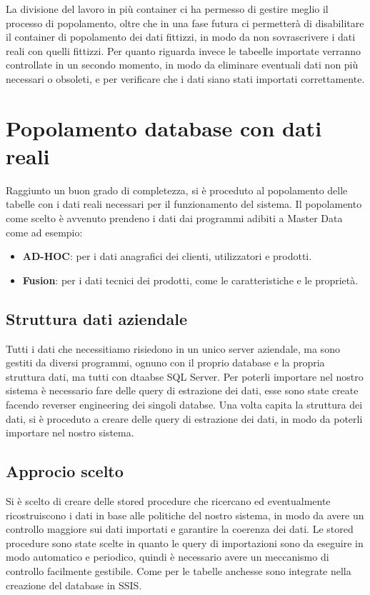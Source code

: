 \documentclass[12pt, a4paper]{article}
\begin{document}
La divisione del lavoro in più container ci ha permesso di gestire meglio il processo di popolamento, oltre che in una fase futura ci permetterà di 
disabilitare il container di popolamento dei dati fittizzi, in modo da non sovrascrivere i dati reali con quelli fittizzi.
Per quanto riguarda invece le tabeelle importate verranno controllate in un secondo momento, in modo da eliminare eventuali dati non più necessari o obsoleti,
e per verificare che i dati siano stati importati correttamente.

\section{Popolamento database con dati reali}
Raggiunto un buon grado di completezza, si è proceduto al popolamento delle tabelle con i dati reali 
necessari per il funzionamento del sistema.
Il popolamento come scelto è avvenuto prendeno i dati dai programmi adibiti a Master Data come ad esempio:
\begin{itemize}
    \item \textbf{AD-HOC}: per i dati anagrafici dei clienti, utilizzatori e prodotti.
    \item \textbf{Fusion}: per i dati tecnici dei prodotti, come le caratteristiche e le proprietà.
\end{itemize}
\subsection{Struttura dati aziendale}
Tutti i dati che necessitiamo risiedono in un unico server aziendale, ma sono gestiti da diversi programmi,
 ognuno con il proprio database e la propria struttura dati, ma tutti con dtaabse SQL Server.
  Per poterli importare nel nostro sistema è necessario fare delle query di estrazione dei dati, esse 
  sono state create facendo reverser engineering dei singoli databse.
  Una volta capita la struttura dei dati, si è proceduto a creare delle query di estrazione dei dati,
   in modo da poterli importare nel nostro sistema.

\subsection{Approcio scelto}
Si è scelto di creare delle stored procedure che ricercano ed eventualmente ricostruiscono i dati in base alle politiche del
nostro sistema, in modo da avere un controllo maggiore sui dati importati e garantire la coerenza dei dati.
Le stored procedure sono state scelte in quanto le query di importazioni sono da eseguire in modo automatico e periodico,
quindi è necessario avere un meccanismo di controllo facilmente gestibile.
Come per le tabelle anchesse sono integrate nella creazione del database in SSIS.
\end{document}
